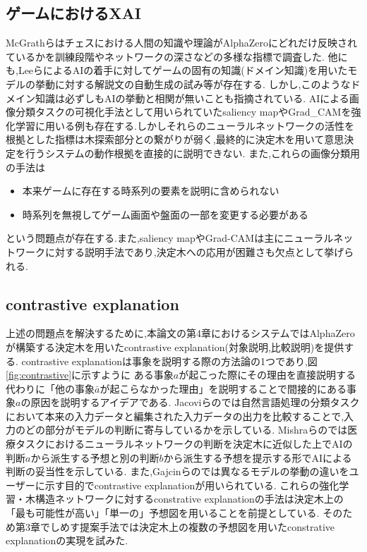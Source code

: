 \subsection{ゲームにおけるXAI}
McGrathら\cite{DeepMind}はチェスにおける人間の知識や理論がAlphaZeroにどれだけ反映されているかを訓練段階やネットワークの深さなどの多様な指標で調査した.
他にも,Leeら\cite{DecodeChess}によるAIの着手に対してゲームの固有の知識(ドメイン知識)を用いたモデルの挙動に対する解説文の自動生成の試み等が存在する.
しかし,このようなドメイン知識は必ずしもAIの挙動と相関が無いことも指摘されている\cite{DeepMind}.
AIによる画像分類タスクの可視化手法として用いられていたsaliency map\cite{saliency}やGrad\_CAM\cite{Grad-CAM}を強化学習に用いる例も存在する\cite{gl}\cite{atari-saliency}\cite{visualize}.しかしそれらのニューラルネットワークの活性を根拠とした指標は木探索部分との繋がりが弱く,最終的に決定木を用いて意思決定を行うシステムの動作根拠を直接的に説明できない.
また,これらの画像分類用の手法は
\begin{itemize}
	\item 本来ゲームに存在する時系列の要素を説明に含められない
	\item 時系列を無視してゲーム画面や盤面の一部を変更する必要がある
\end{itemize}
という問題点が存在する.また,saliency mapやGrad-CAMは主にニューラルネットワークに対する説明手法であり,決定木への応用が困難さも欠点として挙げられる.

\subsection{contrastive explanation}
上述の問題点を解決するために,本論文の第4章におけるシステムではAlphaZeroが構築する決定木を用いたcontrastive explanation(対象説明,比較説明)を提供する.
contrastive explanationは事象を説明する際の方法論の1つであり,図\ref{fig:contrastive}に示すように
ある事象$a$が起こった際にその理由を直接説明する代わりに「他の事象$\bar{a}$が起こらなかった理由」を説明することで間接的にある事象$a$の原因を説明するアイデアである\cite{contrastive}.
Jacoviらの\cite{contrastive}では自然言語処理の分類タスクにおいて本来の入力データと編集された入力データの出力を比較することで,入力のどの部分がモデルの判断に寄与しているかを示している.
Mishraらの\cite{whyNot}では医療タスクにおけるニューラルネットワークの判断を決定木に近似した上でAIの判断$a$から派生する予想と別の判断$b$から派生する予想を提示する形でAIによる判断の妥当性を示している.
また,Gajcinらの\cite{preference}では異なるモデルの挙動の違いをユーザーに示す目的でcontrastive explanationが用いられている.
これらの強化学習・木構造ネットワークに対するconstrative explanationの手法は決定木上の「最も可能性が高い」「単一の」予想図を用いることを前提としている.
そのため第3章でしめす提案手法では決定木上の複数の予想図を用いたconstrative explanationの実現を試みた.

